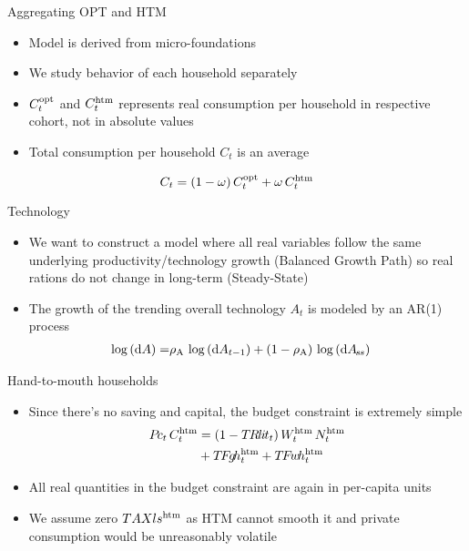 \begin{frame}{Aggregating OPT and HTM}
  \begin{itemize}
   \item Model is derived from micro-foundations
   \item We study behavior of each household separately
   \item $C^{\text{opt}}_t$ and $C^{\text{htm}}_t$ represents real consumption per household in respective cohort, not in absolute values
   \item Total consumption per household $C_t$ is an average
\end{itemize}
\vspace*{-2mm}
   \begin{equation*}
     C_t = \left(1-\omega\right)C_t^{\text{opt}}+\omega\,C_t^{\text{htm}}
  \end{equation*}      

\end{frame}

\begin{frame}{Technology}
  \begin{itemize}
   \item We want to construct a model where all real variables follow the same underlying productivity/technology growth (Balanced Growth Path) so real rations do not change in long-term (Steady-State)
    \item The growth of the trending overall technology $A_t$ is modeled by an AR(1) process 
   \vspace{-3mm}
  \begin{align*}
    \log\left(\text{d} A\right)= & \rho_{\text{A}}\,\log\left(\text{d} A_{t-1}\right) + 
    \left(1-\rho_{\text{A}}\right)\,\log\left({\text{d} A}_{\hspace{-0.10em}s\hspace{-0.05em}s}\right)
     \end{align*}
 \end{itemize}
\end{frame}

\begin{frame}{Hand-to-mouth households}
  \begin{itemize}
    \item Since there's no saving and capital, the budget constraint is extremely simple
    \begin{align*}
      P\hspace{-0.15em}c_t \, C^{\text{htm}}_t & = \left(1 - T\hspace{-0.1em}R\hspace{-0.075em}l\hspace{-0.075em}i\hspace{-0.075em}t_t\right) W_t^{\text{htm}}\, N^{\text{htm}}_t \\
                & +  T\hspace{-0.125em}F\hspace{-0.15em}g\hspace{-0.15em}h^{\text{htm}}_t  + T\hspace{-0.125em}F\hspace{-0.15em}w\hspace{-0.15em}h^{\text{htm}}_t
    \end{align*}
  \item All real quantities in the budget constraint are again in per-capita units
  \item \textcolor{ogr12}{We assume zero $TAXls^{\text{htm}}$ as HTM cannot smooth it and private consumption would be unreasonably volatile}
 \end{itemize} 
\end{frame}

